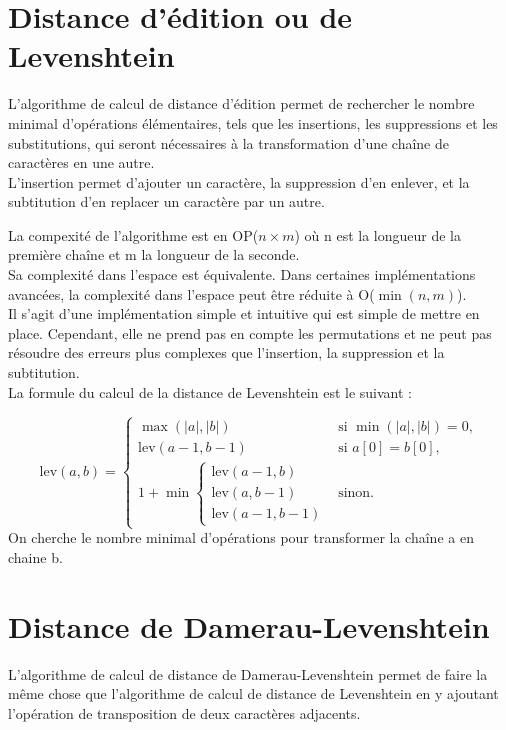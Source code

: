 \documentclass[a4paper, 11pt]{report}
\begin{document}
\section{Distance d'édition ou de Levenshtein}

L'algorithme de calcul de distance d'édition permet de rechercher le nombre minimal d'opérations élémentaires, tels que les insertions, les suppressions et les substitutions, qui seront nécessaires à la transformation d'une chaîne de caractères en une autre. \\
L'insertion permet d'ajouter un caractère, la suppression d'en enlever, et la subtitution d'en replacer un caractère par un autre. 

La compexité de l'algorithme est en OP($n \times m$) où n est la longueur de la première chaîne et m la longueur de la seconde. \\
Sa complexité dans l'espace est équivalente. Dans certaines implémentations avancées, la complexité dans l'espace peut être réduite à O($\min(n,m)$). \\

Il s'agit d'une implémentation simple et intuitive qui est simple de mettre en place. Cependant, elle ne prend pas en compte les permutations et ne peut pas résoudre des erreurs plus complexes que l'insertion, la suppression et la subtitution. \\
\newpage
La formule du calcul de la distance de Levenshtein est le suivant : 

\[
\text{lev}(a, b) =
\begin{cases}
\max(|a|, |b|) & \text{si } \min(|a|, |b|) = 0, \\
\text{lev}(a - 1, b - 1) & \text{si } a[0] = b[0], \\
1 + \min \begin{cases}
\text{lev}(a - 1, b) \\
\text{lev}(a, b - 1) \\
\text{lev}(a - 1, b - 1)
\end{cases} & \text{sinon}.
\end{cases}
\]
On cherche le nombre minimal d'opérations pour transformer la chaîne a en chaine b.

\section{Distance de Damerau-Levenshtein}

L'algorithme de calcul de distance de Damerau-Levenshtein permet de faire la même chose que l'algorithme de calcul de distance de Levenshtein en y ajoutant l'opération de transposition de deux caractères adjacents.  \\
\end{document}
